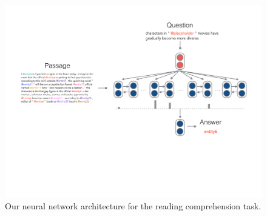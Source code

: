 \begin{figure}[!ht]
\centering
    \includegraphics[scale=0.37]{figures/fig_model.pdf}
\caption{Our neural network architecture for the reading comprehension task.}
\label{fig:framework}
\end{figure}

